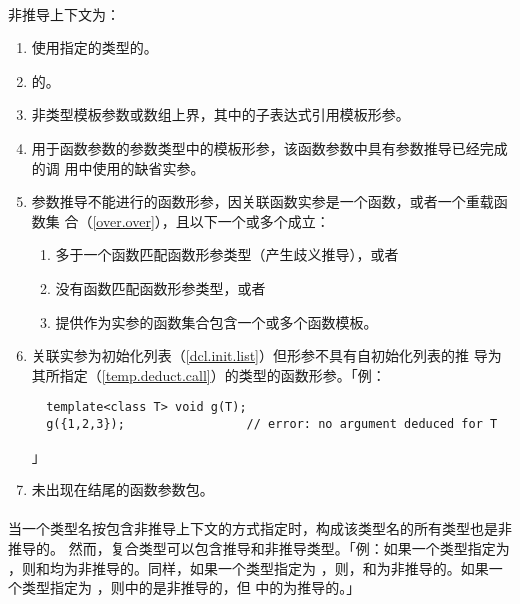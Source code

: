 \paragraph{}
非推导上下文为：
\begin{enumerate}
  \item{使用指定的类型的。}
  \item{的。}
  \item{非类型模板参数或数组上界，其中的子表达式引用模板形参。}
  \item{用于函数参数的参数类型中的模板形参，该函数参数中具有参数推导已经完成的调
    用中使用的缺省实参。}
  \item{参数推导不能进行的函数形参，因关联函数实参是一个函数，或者一个重载函数集
    合（\ref{over.over}），且以下一个或多个成立：
    \begin{enumerate}
      \item{多于一个函数匹配函数形参类型（产生歧义推导），或者}
      \item{没有函数匹配函数形参类型，或者}
      \item{提供作为实参的函数集合包含一个或多个函数模板。}
    \end{enumerate}}
  \item{关联实参为初始化列表（\ref{dcl.init.list}）但形参不具有自初始化列表的推
    导为其所指定（\ref{temp.deduct.call}）的类型的函数形参。「例：
\begin{lstlisting}
  template<class T> void g(T);
  g({1,2,3});                 // error: no argument deduced for T
\end{lstlisting}」}
  \item{未出现在结尾的函数参数包。}
\end{enumerate}

\paragraph{}
当一个类型名按包含非推导上下文的方式指定时，构成该类型名的所有类型也是非推导的。
然而，复合类型可以包含推导和非推导类型。「例：如果一个类型指定为
，则和均为非推导的。同样，如果一个类型指定为
，则，和为非推导的。如果一个类型指定为
，则中的是非推导的，但
中的为推导的。」


